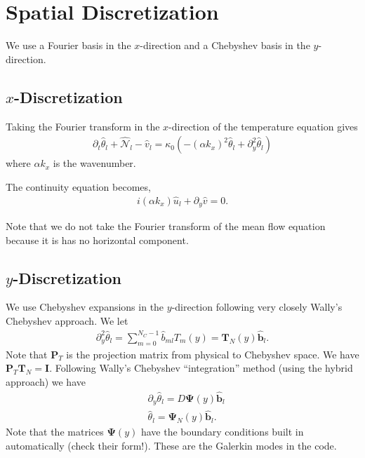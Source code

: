\documentclass[12pt]{article}
\newcommand{\lr}[1]{\left(#1\right)}
\newcommand{\wh}[1]{\widehat{#1}}
\begin{document}
  \section{Spatial Discretization}
  We use a Fourier basis in the $x$-direction and a Chebyshev basis in the $y$-direction.

  \subsection{$x$-Discretization}
    Taking the Fourier transform in the $x$-direction of the temperature equation gives 
    \begin{align}
      \partial_{t}\wh{\theta}_{l} + \wh{\mathcal{N}}_{l} - \wh{v}_{l} = 
        \kappa_{0}\lr{-\lr{\alpha k_{x}}^{2}\wh{\theta}_{l} + \partial_{y}^{2}\wh{\theta}_{l}}
      \label{eq:Tl}
    \end{align}
    where $\alpha k_{x}$ is the wavenumber.

    The continuity equation becomes,
    \begin{align}
      i\lr{\alpha k_{x}}\wh{u}_{l} + \partial_{y}\wh{v} = 0 \label{eq:cont_l}.
    \end{align}

    Note that we do not take the Fourier transform of the mean flow equation because it is
    has no horizontal component.

%

  \subsection{$y$-Discretization}
    We use Chebyshev expansions in the $y$-direction following very closely Wally's 
    Chebyshev approach.  We let 
    \begin{align}
      \partial_{y}^{2}\wh{\theta}_{l} = \sum_{m=0}^{N_{C}-1}{\wh{b}_{ml}T_{m}\lr{y}} = \mathbf{T}_{N}\lr{y}\wh{\mathbf{b}}_{l}.
    \end{align}
    Note that $\mathbf{P}_{T}$ is the projection matrix from physical to Chebyshev space.  
    We have $\mathbf{P}_{T}\mathbf{T}_{N} = \mathbf{I}$.  Following Wally's Chebyshev ``integration'' method 
    (using the hybrid approach) we have 
    \begin{align}
      &\partial_{y}\wh{\theta}_{l} = D\boldsymbol{\Psi}\lr{y}\wh{\mathbf{b}}_{l} \\
      &\wh{\theta}_{l} = \boldsymbol{\Psi}_{N}\lr{y}\wh{\mathbf{b}}_{l}.
    \end{align}
    Note that the matrices $\boldsymbol{\Psi}\lr{y}$ have the boundary conditions 
    built in automatically (check their form!).  These are the Galerkin modes in the 
    code.  
\end{document}
